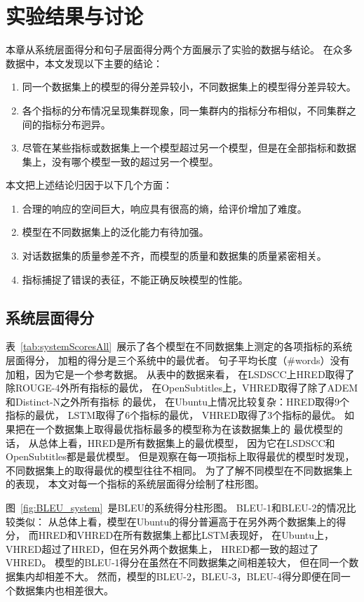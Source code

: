 \chapter{实验结果与讨论}\label{ch:experiment}
本章从系统层面得分和句子层面得分两个方面展示了实验的数据与结论。
在众多数据中，本文发现以下主要的结论：
\begin{enumerate}
    \item 同一个数据集上的模型的得分差异较小，不同数据集上的模型得分差异较大。
    \item 各个指标的分布情况呈现集群现象，同一集群内的指标分布相似，不同集群之间的指标分布迥异。
    \item 尽管在某些指标或数据集上一个模型超过另一个模型，但是在全部指标和数据集上，没有哪个模型一致的超过另一个模型。
\end{enumerate}
本文把上述结论归因于以下几个方面：
\begin{enumerate}
    \item 合理的响应的空间巨大，响应具有很高的熵，给评价增加了难度。
    \item 模型在不同数据集上的泛化能力有待加强。
    \item 对话数据集的质量参差不齐，而模型的质量和数据集的质量紧密相关。
    \item 指标捕捉了错误的表征，不能正确反映模型的性能。
\end{enumerate}

\section{系统层面得分}\label{sec:system_scores}
表~\ref{tab:systemScoresAll}~展示了各个模型在不同数据集上测定的各项指标的系统层面得分，
加粗的得分是三个系统中的最优者。
句子平均长度（\#words）没有加粗，因为它是一个参考数据。
从表中的数据来看，
在LSDSCC上HRED取得了除ROUGE-4外所有指标的最优，
在OpenSubtitles上，VHRED取得了除了ADEM和Distinct-N之外所有指标
的最优，
在Ubuntu上情况比较复杂：HRED取得9个指标的最优，
LSTM取得了6个指标的最优，
VHRED取得了3个指标的最优。
如果把在一个数据集上取得最优指标最多的模型称为在该数据集上的
最优模型的话，
从总体上看，HRED是所有数据集上的最优模型，
因为它在LSDSCC和OpenSubtitles都是最优模型。
但是观察在每一项指标上取得最优的模型时发现，
不同数据集上的取得最优的模型往往不相同。
为了了解不同模型在不同数据集上的表现，
本文对每一个指标的系统层面得分绘制了柱形图。


图~\ref{fig:BLEU_system}~是BLEU的系统得分柱形图。
BLEU-1和BLEU-2的情况比较类似：
从总体上看，模型在Ubuntu的得分普遍高于在另外两个数据集上的得分，
而HRED和VHRED在所有数据集上都比LSTM表现好，
在Ubuntu上，VHRED超过了HRED，但在另外两个数据集上，
HRED都一致的超过了VHRED。
模型的BLEU-1得分在虽然在不同数据集之间相差较大，
但在同一个数据集内却相差不大。
然而，模型的BLEU-2，BLEU-3，BLEU-4得分即便在同一个数据集内也相差很大。


